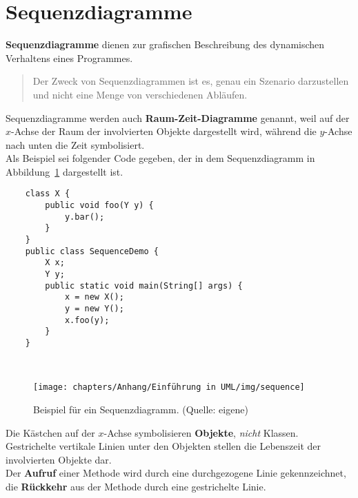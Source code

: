 \newpage
\section{Sequenzdiagramme}\label{sec:sequenzdiagramme}

\textbf{Sequenzdiagramme} dienen zur grafischen Beschreibung des dynamischen Verhaltens eines Programmes.

\begin{tcolorbox}[enlarge top by=0.5cm,enlarge bottom by=0.5cm]
\blockquote[{\cite[333]{Oes05}}]{
Der Zweck von Sequenzdiagrammen ist es, genau ein Szenario darzustellen und nicht eine Menge von verschiedenen Abläufen.
}
\end{tcolorbox}

\noindent
Sequenzdiagramme werden auch \textbf{Raum-Zeit-Diagramme} genannt, weil auf der $x$-Achse der Raum der involvierten
Objekte dargestellt wird, während die $y$-Achse nach unten die Zeit symbolisiert.\\

\noindent
Als Beispiel sei folgender Code gegeben, der in dem Sequenzdiagramm in Abbildung~\ref{fig:sequence} dargestellt ist.

\begin{verbatim}
    class X {
        public void foo(Y y) {
            y.bar();
        }
    }
    public class SequenceDemo {
        X x;
        Y y;
        public static void main(String[] args) {
            x = new X();
            y = new Y();
            x.foo(y);
        }
    }
\end{verbatim}\\


\begin{figure}
    \centering
    \texttt{[image: chapters/Anhang/Einführung in UML/img/sequence]}
    \caption{Beispiel für ein Sequenzdiagramm. (Quelle: eigene)}
    \label{fig:sequence}
\end{figure}

\noindent
Die Kästchen auf der $x$-Achse symbolisieren \textbf{Objekte}, \textit{nicht} Klassen.\\

\noindent
Gestrichelte vertikale Linien unter den Objekten stellen die Lebenszeit der involvierten Objekte dar.\\

\noindent
Der \textbf{Aufruf} einer Methode wird durch eine durchgezogene Linie gekennzeichnet, die \textbf{Rückkehr} aus der Methode durch eine
gestrichelte Linie.

